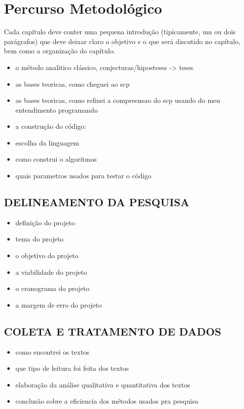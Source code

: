 
\chapter{\larger Percurso Metodológico}
\label{chap:metodologia}
Cada capítulo deve conter uma pequena introdução (tipicamente, um ou dois parágrafos) que deve deixar claro o objetivo e o que será discutido no capítulo, bem como a organização do capítulo.

\begin{itemize}
  \item o método analitico clássico, conjecturas/hiposteses -> teses
  \item as bases teoricas, como cheguei ao scp
  \item as bases teoricas, como refinei a compreensao do scp usando do meu entendimento programando
  \item a construção do código:
  \item escolha da linguagem
  \item como construi o algoritmos
  \item quais parametros usados para testar o código
\end{itemize}

\section{DELINEAMENTO DA PESQUISA}
\label{sec:titSecDelPesq}

\begin{itemize}
  \item definição do projeto
  \item tema do projeto
  \item o objetivo do projeto
  \item a viabilidade do projeto
  \item o cronograma do projeto
  \item a margem de erro do projeto
\end{itemize}

\section{COLETA E TRATAMENTO DE DADOS}
\label{sec:titSecColDad}

\begin{itemize}
  \item como encontrei os textos
  \item que tipo de leitura foi feita dos textos
  \item elaboração da análise qualitativa e quantitativa dos textos
  \item conclusão sobre a eficiencia dos métodos usados pra pesquisa
\end{itemize}